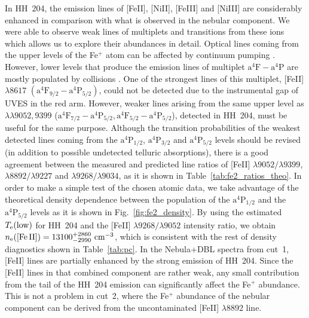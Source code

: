 \documentclass[twocolumn]{aastex63}
\begin{document}
In HH~204, the emission lines of [Fe\thinspace II], [Ni\thinspace II], [Fe\thinspace III] and [Ni\thinspace III] are considerably enhanced in comparison with what is observed in the nebular component. We were able to observe weak lines of  multiplets and transitions from these ions which allows us to explore their abundances in detail. Optical lines coming from the upper levels of the Fe$^{+}$ atom can be affected by continuum pumping \citep[][]{Lucy95,rodriguez99, verner00}. However, lower levels that produce the emission lines of multiplet $\text{a}^{4}\text{F}-\text{a}^{4}\text{P}$ are mostly populated by collisions \citep[][]{Baldwin96}. One of the strongest lines of this multiplet, [Fe\thinspace II] $\lambda 8617$ $(\text{a}^{4}\text{F}_{9/2}-\text{a}^{4}\text{P}_{5/2})$, could not be detected due to the instrumental gap of UVES in the red arm. However, weaker lines arising from the same upper level as $\lambda\lambda 9052, 9399$ ($\text{a}^{4}\text{F}_{7/2}-\text{a}^{4}\text{P}_{5/2}, \text{a}^{4}\text{F}_{5/2}-\text{a}^{4}\text{P}_{5/2} $), detected in HH~204, must be useful for the same purpose. Although the transition probabilities of the weakest detected lines coming from the $\text{a}^{4}\text{P}_{1/2}$, $\text{a}^{4}\text{P}_{3/2}$ and  $\text{a}^{4}\text{P}_{5/2}$ levels should be revised (in addition to possible undetected telluric absorptions), there is a good agreement between the measured and predicted line ratios of [Fe\thinspace II] $\lambda9052/\lambda9399$, $\lambda8892/\lambda9227$ and $\lambda9268/\lambda9034$, as it is shown in Table~\ref{tab:fe2_ratios_theo}. In order to make a simple test of the chosen atomic data, we take advantage of the theoretical density dependence between the population of the $\text{a}^{4}\text{P}_{1/2}$ and the $\text{a}^{4}\text{P}_{5/2}$ levels as it is shown in Fig.~\ref{fig:fe2_density}. By using the estimated $T_{\rm e}(\text{low})$ for HH~204 and the [Fe\thinspace II] $\lambda9268/\lambda9052$ intensity ratio, we obtain $n_{\rm e}(\text{[Fe\thinspace II]})=13100 ^{+2860} _{-2990} \text{ cm}^{-3}$, which is consistent with the rest of density diagnostics shown in Table~\ref{tab:pc}. In the Nebula+DBL spectra from cut~1, [Fe\thinspace II] lines are partially enhanced by the strong emission of HH~204. Since the [Fe\thinspace II] lines in that combined component are rather weak, any small contribution from the tail of the HH~204 emission can significantly affect the Fe$^{+}$ abundance. This is not a problem in cut~2, where the Fe$^{+}$ abundance of the nebular component can be derived from the  uncontaminated [Fe\thinspace II] $\lambda 8892$ line.
\end{document}
